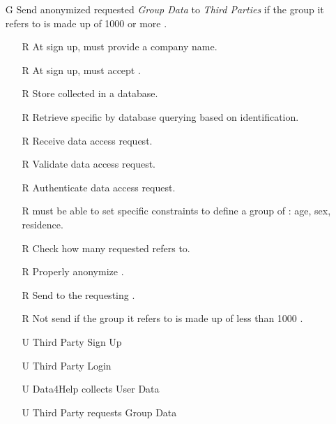 \documentclass[../../../rasd.tex]{subfiles}
\begin{document}
\begin{itemize}
    \item[G\subs{3}]Send anonymized requested \textit{Group Data} to \textit{Third Parties} if the group it refers to is made up of 1000 or more .
    \begin{itemize}
            \item[R\subs{3}]At sign up,  must provide a company name.
            \item[R\subs{5}]At sign up,  must accept .
        \item[R\subs{11}]Store collected  in a database.
        \item[R\subs{12}]Retrieve specific  by database querying based on  identification.
        \item[R\subs{13}]Receive  data access request.
        \item[R\subs{14}]Validate  data access request.
        \item[R\subs{15}]Authenticate  data access request.
        \item[R\subs{21}] must be able to set specific constraints to define a group of : age, sex, residence.
        \item[R\subs{22}]Check how many  requested  refers to.
        \item[R\subs{23}]Properly anonymize .
        \item[R\subs{24}]Send  to the requesting .
        \item[R\subs{25}]Not send  if the group it refers to is made up of less than 1000 .
        \\
        \item[U\subs{2}]Third Party Sign Up
        \item[U\subs{4}]Third Party Login
        \item[U\subs{5}]Data4Help collects User Data
        \item[U\subs{7}]Third Party requests Group Data
    \end{itemize}


\end{itemize}
\end{document}
